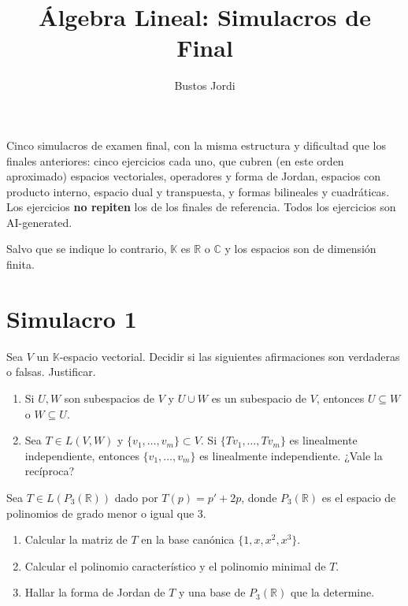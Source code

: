 \documentclass{article}
\newcommand{\R}{\mathbb{R}}
\newcommand{\C}{\mathbb{C}}
\newcommand{\K}{\mathbb{K}}
\newenvironment{ejercicio}[1]{\begin{trivlist}
\item[\hskip \labelsep {\bfseries #1.}]}{\end{trivlist}}
\begin{document}
\title{Álgebra Lineal: Simulacros de Final}
\author{Bustos Jordi}
\date{}
\maketitle

\noindent Cinco simulacros de examen final, con la misma estructura y dificultad que los finales anteriores: cinco ejercicios cada uno, que cubren (en este orden aproximado) espacios vectoriales, operadores y forma de Jordan, espacios con producto interno, espacio dual y transpuesta, y formas bilineales y cuadráticas. Los ejercicios \textbf{no repiten} los de los finales de referencia. Todos los ejercicios son AI-generated.

\noindent Salvo que se indique lo contrario, \( \K \) es \( \R \) o \( \C \) y los espacios son de dimensión finita.

\tableofcontents

\newpage
\section*{Simulacro 1}

\begin{ejercicio}{1}
    Sea \( V \) un \( \K \)-espacio vectorial. Decidir si las siguientes afirmaciones son verdaderas o falsas. Justificar.
    \begin{enumerate}
        \item Si \( U, W \) son subespacios de \( V \) y \( U \cup W \) es un subespacio de \( V \), entonces \( U \subseteq W \) o \( W \subseteq U \).
        \item Sea \( T \in L(V, W) \) y \( \{v_1, \dots, v_m\} \subset V \). Si \( \{Tv_1, \dots, Tv_m\} \) es linealmente independiente, entonces \( \{v_1, \dots, v_m\} \) es linealmente independiente. ¿Vale la recíproca?
    \end{enumerate}
\end{ejercicio}

\begin{ejercicio}{2}
    Sea \( T \in L(P_3(\R)) \) dado por \( T(p) = p' + 2p \), donde \( P_3(\R) \) es el espacio de polinomios de grado menor o igual que 3.
    \begin{enumerate}
        \item Calcular la matriz de \( T \) en la base canónica \( \{1, x, x^2, x^3\} \).
        \item Calcular el polinomio característico y el polinomio minimal de \( T \).
        \item Hallar la forma de Jordan de \( T \) y una base de \( P_3(\R) \) que la determine.
    \end{enumerate}
\end{ejercicio}
\end{document}
